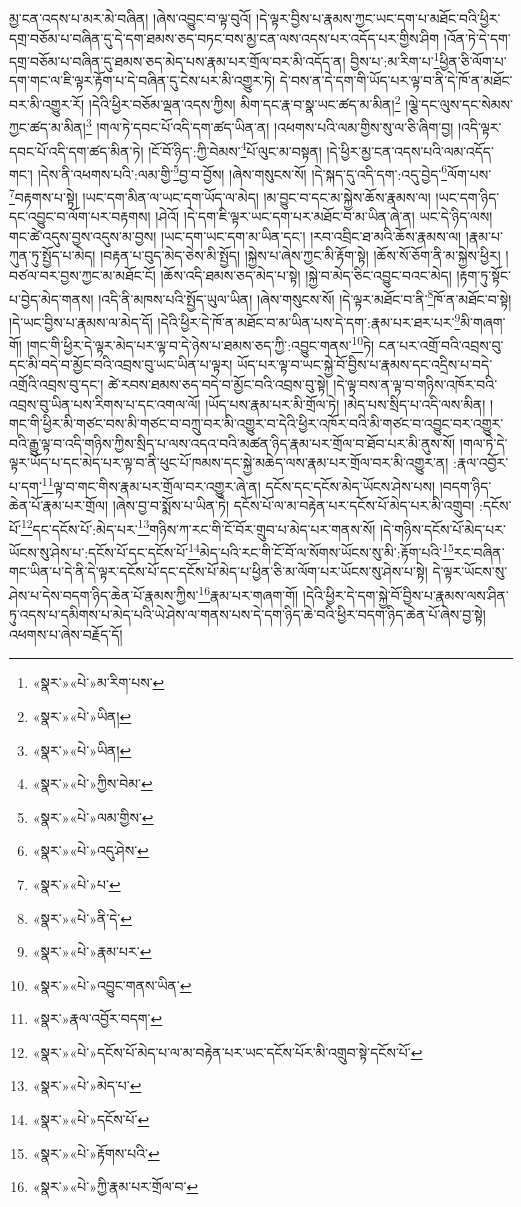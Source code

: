 མྱ་ངན་འདས་པ་མར་མེ་བཞིན། །ཞེས་འབྱུང་བ་ལྟ་བུའོ། །དེ་ལྟར་བྱིས་པ་རྣམས་ཀྱང་ཡང་དག་པ་མཐོང་བའི་ཕྱིར་དགྲ་བཅོམ་པ་བཞིན་དུ་དེ་དག་ཐམས་ཅད་བཏང་བས་མྱ་ངན་ལས་འདས་པར་འདོད་པར་གྱིས་ཤིག །འོན་ཏེ་དེ་དག་དགྲ་བཅོམ་པ་བཞིན་དུ་ཐམས་ཅད་མེད་པས་རྣམ་པར་གྲོལ་བར་མི་འདོད་ན། བྱིས་པ་:མ་རིག་པ་\footnote{«སྣར་»«པེ་»མ་རིག་པས་}ཕྱིན་ཅི་ལོག་པ་དག་གང་ལ་ཇི་ལྟར་རྟོག་པ་དེ་བཞིན་དུ་ངེས་པར་མི་འགྱུར་ཏེ། དེ་བས་ན་དེ་དག་གི་ཡོད་པར་ལྟ་བ་ནི་དེ་ཁོ་ན་མཐོང་བར་མི་འགྱུར་རོ། །དེའི་ཕྱིར་བཅོམ་ལྡན་འདས་ཀྱིས། མིག་དང་རྣ་བ་སྣ་ཡང་ཚད་མ་མིན།\footnote{«སྣར་»«པེ་»ཡིན།} །ལྕེ་དང་ལུས་དང་སེམས་ཀྱང་ཚད་མ་མིན།\footnote{«སྣར་»«པེ་»ཡིན།} །གལ་ཏེ་དབང་པོ་འདི་དག་ཚད་ཡིན་ན། །འཕགས་པའི་ལམ་གྱིས་སུ་ལ་ཅི་ཞིག་བྱ། །འདི་ལྟར་དབང་པོ་འདི་དག་ཚད་མིན་ཏེ། །ངོ་བོ་ཉིད་:ཀྱི་བེམས་\footnote{«སྣར་»«པེ་»ཀྱིས་བེམ་}པོ་ལུང་མ་བསྟན། །དེ་ཕྱིར་མྱ་ངན་འདས་པའི་ལམ་འདོད་གང་། །དེས་ནི་འཕགས་པའི་:ལམ་གྱི་\footnote{«སྣར་»«པེ་»ལམ་གྱིས་}བྱ་བ་བྱོས། །ཞེས་གསུངས་སོ། །དེ་སྐད་དུ་འདི་དག་:འདུ་བྱེད་\footnote{«སྣར་»«པེ་»འདུ་ཤེས་}ལོག་པས་\footnote{«སྣར་»«པེ་»པ་}བརྟགས་པ་སྟེ། །ཡང་དག་མིན་ལ་ཡང་དག་ཡོད་ལ་མེད། །མ་བྱུང་བ་དང་མ་སྐྱེས་ཆོས་རྣམས་ལ། །ཡང་དག་ཉིད་དང་འབྱུང་བ་ལོག་པར་བརྟགས། །ཤེའོ། །དེ་དག་ཇི་ལྟར་ཡང་དག་པར་མཐོང་བ་མ་ཡིན་ཞེ་ན། ཡང་དེ་ཉིད་ལས། གང་ཚེ་འདུས་བྱས་འདུས་མ་བྱས། །ཡང་དག་ཡང་དག་མ་ཡིན་དང་། །རབ་འབྲིང་ཐ་མའི་ཆོས་རྣམས་ལ། །རྣམ་པ་ཀུན་ཏུ་སྤྱོད་པ་མེད། །བརྟན་པ་བུད་མེད་ཅེས་མི་སྤྱོད། །སྐྱེས་པ་ཞེས་ཀྱང་མི་རྟོག་སྟེ། །ཆོས་སོ་ཅོག་ནི་མ་སྐྱེས་ཕྱིར། །བཙལ་བར་བྱས་ཀྱང་མ་མཐོང་ངོ། །ཆོས་འདི་ཐམས་ཅད་མེད་པ་སྟེ། །སྐྱེ་བ་མེད་ཅིང་འབྱུང་བའང་མེད། །རྟག་ཏུ་སྟོང་པ་བྱེད་མེད་གནས། །འདི་ནི་མཁས་པའི་སྤྱོད་ཡུལ་ཡིན། །ཞེས་གསུངས་སོ། །དེ་ལྟར་མཐོང་བ་ནི་\footnote{«སྣར་»«པེ་»ནི་དེ་}ཁོ་ན་མཐོང་བ་སྟེ། །དེ་ཡང་བྱིས་པ་རྣམས་ལ་མེད་དོ། །དེའི་ཕྱིར་དེ་ཁོ་ན་མཐོང་བ་མ་ཡིན་པས་དེ་དག་:རྣམ་པར་ཐར་པར་\footnote{«སྣར་»«པེ་»རྣམ་པར་}མི་གཞག་གོ། །གང་གི་ཕྱིར་དེ་ལྟར་མེད་པར་ལྟ་བ་དེ་ཉེས་པ་ཐམས་ཅད་ཀྱི་:འབྱུང་གནས་\footnote{«སྣར་»«པེ་»འབྱུང་གནས་ཡིན་}ཏེ། ངན་པར་འགྲོ་བའི་འབྲས་བུ་དང་མི་བདེ་བ་མྱོང་བའི་འབྲས་བུ་ཡང་ཡིན་པ་ལྟར། ཡོད་པར་ལྟ་བ་ཡང་སྐྱེ་བོ་བྱིས་པ་རྣམས་དང་འདྲིས་པ་བདེ་འགྲོའི་འབྲས་བུ་དང་། ཚེ་རབས་ཐམས་ཅད་བདེ་བ་མྱོང་བའི་འབྲས་བུ་སྟེ། །དེ་ལྟ་བས་ན་ལྟ་བ་གཉིས་འཁོར་བའི་འབྲས་བུ་ཡིན་པས་རིགས་པ་དང་འགལ་ལོ། །ཡོད་པས་རྣམ་པར་མི་གྲོལ་ཏེ། །མེད་པས་སྲིད་པ་འདི་ལས་མིན། །གང་གི་ཕྱིར་མི་གཙང་བས་མི་གཙང་བ་བཀྲུ་བར་མི་འགྱུར་བ་དེའི་ཕྱིར་འཁོར་བའི་མི་གཙང་བ་འབྱུང་བར་འགྱུར་བའི་རྒྱུ་ལྟ་བ་འདི་གཉིས་ཀྱིས་སྲིད་པ་ལས་འདའ་བའི་མཚན་ཉིད་རྣམ་པར་གྲོལ་བ་ཐོབ་པར་མི་ནུས་སོ། །གལ་ཏེ་དེ་ལྟར་ཡོད་པ་དང་མེད་པར་ལྟ་བ་ནི་ཕུང་པོ་ཁམས་དང་སྐྱེ་མཆེད་ལས་རྣམ་པར་གྲོལ་བར་མི་འགྱུར་ན། :རྣལ་འབྱོར་པ་དག་\footnote{«སྣར་»རྣལ་འབྱོར་བདག་}ལྟ་བ་གང་གིས་རྣམ་པར་གྲོལ་བར་འགྱུར་ཞེ་ན། དངོས་དང་དངོས་མེད་ཡོངས་ཤེས་པས། །བདག་ཉིད་ཆེན་པོ་རྣམ་པར་གྲོལ། །ཞེས་བྱ་བ་སྨོས་པ་ཡིན་ཏེ། དངོས་པོ་ལ་མ་བརྟེན་པར་དངོས་པོ་མེད་པར་མི་འགྲུབ། :དངོས་པོ་\footnote{«སྣར་»«པེ་»དངོས་པོ་མེད་པ་ལ་མ་བརྟེན་པར་ཡང་དངོས་པོར་མི་འགྲུབ་སྟེ་དངོས་པོ་}དང་དངོས་པོ་:མེད་པར་\footnote{«སྣར་»«པེ་»མེད་པ་}གཉིས་ཀ་རང་གི་ངོ་བོར་གྲུབ་པ་མེད་པར་གནས་སོ། །དེ་གཉིས་དངོས་པོ་མེད་པར་ཡོངས་སུ་ཤེས་པ་:དངོས་པོ་དང་དངོས་པོ་\footnote{«སྣར་»«པེ་»དངོས་པོ་}མེད་པའི་རང་གི་ངོ་བོ་ལ་སོགས་ཡོངས་སུ་མི་:རྟོག་པའི་\footnote{«སྣར་»«པེ་»རྟོགས་པའི་}རང་བཞིན་གང་ཡིན་པ་དེ་ནི་དེ་ལྟར་དངོས་པོ་དང་དངོས་པོ་མེད་པ་ཕྱིན་ཅི་མ་ལོག་པར་ཡོངས་སུ་ཤེས་པ་སྟེ། དེ་ལྟར་ཡོངས་སུ་ཤེས་པ་དེས་བདག་ཉིད་ཆེན་པོ་རྣམས་ཀྱིས་\footnote{«སྣར་»«པེ་»ཀྱི་རྣམ་པར་གྲོལ་བ་}རྣམ་པར་གཞག་གོ། །དེའི་ཕྱིར་དེ་དག་སྐྱེ་བོ་བྱིས་པ་རྣམས་ལས་ཤིན་ཏུ་འདས་པ་དམིགས་པ་མེད་པའི་ཡེ་ཤེས་ལ་གནས་པས་དེ་དག་ཉིད་ཆེ་བའི་ཕྱིར་བདག་ཉིད་ཆེན་པོ་ཞེས་བྱ་སྟེ། འཕགས་པ་ཞེས་བརྗོད་དོ། 